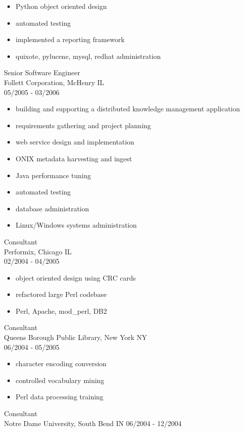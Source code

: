 \begin{itemize}
\item
  Python object oriented design
\item
  automated testing
\item
  implemented a reporting framework
\item
  quixote, pylucene, mysql, redhat administration
\end{itemize}
Senior Software Engineer\\Follett Corporation, McHenry IL\\05/2005
- 03/2006

\begin{itemize}
\item
  building and supporting a distributed knowledge management
  application
\item
  requirements gathering and project planning
\item
  web service design and implementation
\item
  ONIX metadata harvesting and ingest
\item
  Java performance tuning
\item
  automated testing
\item
  database administration
\item
  Linux/Windows systems administration
\end{itemize}
Consultant\\Performix, Chicago IL\\02/2004 - 04/2005

\begin{itemize}
\item
  object oriented design using CRC cards
\item
  refactored large Perl codebase
\item
  Perl, Apache, mod\_perl, DB2
\end{itemize}
Consultant\\Queens Borough Public Library, New York NY\\06/2004 -
05/2005

\begin{itemize}
\item
  character encoding conversion
\item
  controlled vocabulary mining
\item
  Perl data processing training
\end{itemize}
Consultant\\Notre Dame University, South Bend IN 06/2004 - 12/2004


